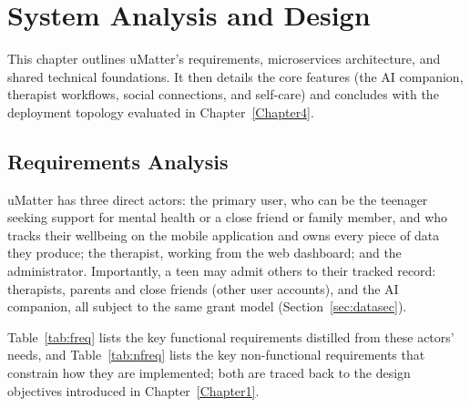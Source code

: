 \chapter{System Analysis and Design}
\label{Chapter3}

This chapter outlines uMatter's requirements, microservices architecture, 
and shared technical foundations. It then details the core features (the AI companion, 
therapist workflows, social connections, and self-care) and concludes with 
the deployment topology evaluated in Chapter~\ref{Chapter4}.

\section{Requirements Analysis}
\label{sec:requirements}

uMatter has three direct actors: the primary user, who can be the teenager
seeking support for mental health or a close friend or family member, and
who tracks their wellbeing on the mobile application and owns every piece
of data they produce; the therapist, working from the web dashboard; and
the administrator. Importantly, a teen may admit others to their tracked
record: therapists, parents and close friends (other user accounts), and
the AI companion, all subject to the same grant model
(Section~\ref{sec:datasec}).

Table~\ref{tab:freq} lists the key functional requirements distilled from
these actors' needs, and Table~\ref{tab:nfreq} lists the key non-functional
requirements that constrain how they are implemented; both are traced back
to the design objectives introduced in Chapter~\ref{Chapter1}.


